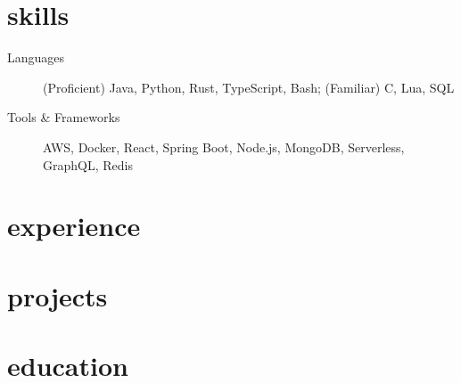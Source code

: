 \documentclass{resume}
\begin{document}
\pagestyle{empty}
\section*{skills}
\begin{description}
  \item[Languages]{(Proficient) Java, Python, Rust, TypeScript, Bash; (Familiar) C, Lua, SQL}
  \item[Tools \& Frameworks]{AWS, Docker, React, Spring Boot, Node.js, MongoDB, Serverless, GraphQL, Redis}
\end{description}
\section*{experience}
\section*{projects}
\section*{education}
\end{document}
